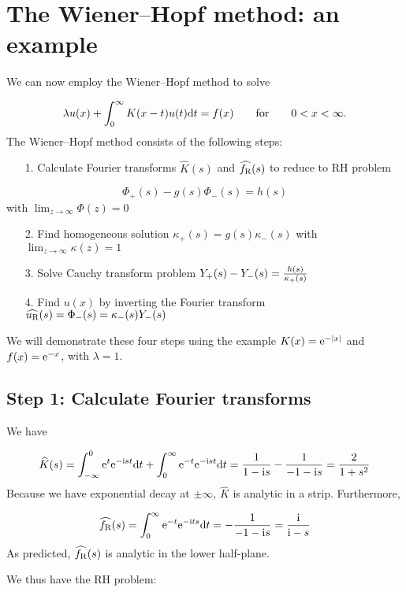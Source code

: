 \documentclass[12pt,a4paper]{article}
\def\qqfor{\qquad\hbox{for}\qquad}
\def\D{ {\rm d} }
\def\I{ {\rm i} }
\def\E{ {\rm e} }
\def\fR{ f_{\rm R} }
\def\dt{\D t}
\def\endash{–}
\begin{document}
\section{The Wiener\ensuremath{\endash}Hopf method: an example}
We can now employ the Wiener\ensuremath{\endash}Hopf method to solve

\[
\lambda u(x) + \int_{0}^\infty K(x-t)u(t) \dt = f(x)\qqfor 0 < x < \infty.
\]
The Wiener\ensuremath{\endash}Hopf method consists of the following steps:

\begin{itemize}
\item[1. ] Calculate Fourier transforms $\widehat K(s)$ and $\widehat{f_{\rm R}}(s)$ to reduce to RH problem

\end{itemize}
\[
\Phi_+(s) -g(s) \Phi_-(s) = h(s)
\]
with $\lim_{z \to \infty} \Phi(z) = 0$

\begin{itemize}
\item[2. ] Find homogeneous solution $\kappa_+(s) = g(s) \kappa_-(s)$ with $\lim_{z \to \infty} \kappa(z) = 1$


\item[3. ] Solve Cauchy transform problem $Y_+(s) - Y_-(s) = {h(s) \over \kappa_+(s)}$


\item[4. ] Find $u(x)$ by inverting the Fourier transform $\widehat{u_{\rm R}}(s) = \Phi_-(s) = \kappa_-(s) Y_-(s)$

\end{itemize}
We will demonstrate these four steps using the example $K(x) = \E^{-|x|}$ and $f(x) = \E^{-x}$, with $\lambda = 1$.

\subsection{Step 1: Calculate Fourier transforms}
We have

\[
\widehat{K}(s) = \int_{-\infty}^0 \E^{t}\E^{-\I s t} \dt + \int_0^\infty \E^{-t} \E^{-\I s t} \dt =
 {1 \over 1-\I s} - {1 \over -1-\I s} = {2 \over 1+s^2}
\]
Because we have exponential decay at $\pm \infty$, $\widehat{K}$ is analytic in a strip. Furthermore,

\[
\widehat{f_{\rm R}}(s) = \int_0^\infty \E^{-t} \E^{-\I t s} \dt = -{1 \over -1-\I s} = {\I \over \I-s}
\]
As predicted, $\widehat{\fR}(s)$ is analytic in the lower half-plane.

We thus have the RH problem:
\end{document}
